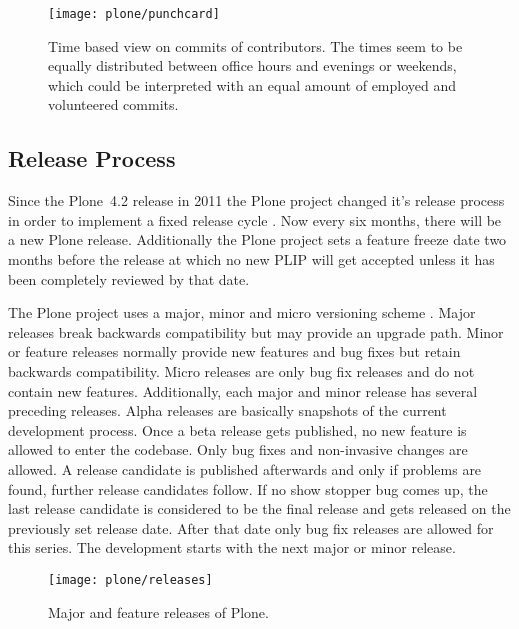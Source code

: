 \begin{figure}[bhtp]
  \centering
  \texttt{[image: plone/punchcard]}
  \caption[Time Based View on Commits, Plone]
  {Time based view on commits of contributors. The times seem to be equally
    distributed between office hours and evenings or weekends, which could be
    interpreted with an equal amount of employed and volunteered commits.}
  \label{fig:plone:p}
\end{figure}


\subsection{Release Process} %

Since the Plone~4.2 release in 2011 the Plone project changed it's release
process in order to implement a fixed release cycle
\cite{PloneFixedReleaseCycle}. Now every six months, there will be a new Plone
release. Additionally the Plone project sets a feature freeze date two months
before the release at which no new \ac{PLIP} will get accepted unless it has
been completely reviewed by that date.

The Plone project uses a major, minor and micro versioning scheme
\cite{PloneReleaseProcess,PloneCommunityProcesses}. Major releases break
backwards compatibility but may provide an upgrade path. Minor or feature
releases normally provide new features and bug fixes but retain backwards
compatibility. Micro releases are only bug fix releases and do not contain new
features. Additionally, each major and minor release has several preceding
releases. Alpha releases are basically snapshots of the current development
process. Once a beta release gets published, no new feature is allowed to enter
the codebase. Only bug fixes and non-invasive changes are allowed. A release
candidate is published afterwards and only if problems are found, further
release candidates follow. If no show stopper bug comes up, the last release
candidate is considered to be the final release and gets released on the
previously set release date. After that date only bug fix releases are allowed
for this series. The development starts with the next major or minor release.

\begin{figure}[htbp]
  \centering
  \texttt{[image: plone/releases]}
  \caption[Major Releases of Plone]{Major and feature releases of Plone.}
\end{figure}

